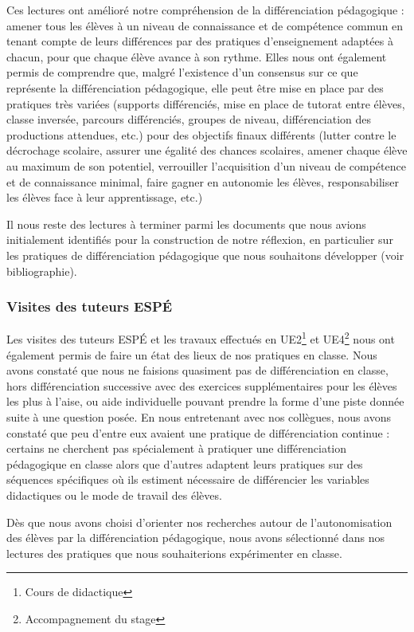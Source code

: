 Ces lectures ont amélioré notre compréhension de la différenciation pédagogique : amener tous les élèves à un niveau de connaissance et de compétence commun en tenant compte de leurs différences par des pratiques d’enseignement adaptées à chacun, pour que chaque élève avance à son rythme. Elles nous ont également permis de comprendre que, malgré l'existence d'un consensus sur ce que représente la différenciation pédagogique, elle peut être mise en place par des pratiques très variées (supports différenciés, mise en place de tutorat entre élèves, classe inversée, parcours différenciés, groupes de niveau, différenciation des productions attendues, etc.) pour des objectifs finaux différents (lutter contre le décrochage scolaire, assurer une égalité des chances scolaires, amener chaque élève au maximum de son potentiel, verrouiller l’acquisition d’un niveau de compétence et de connaissance minimal, faire gagner en autonomie les élèves, responsabiliser les élèves face à leur apprentissage, etc.)

Il nous reste des lectures à terminer parmi les documents que nous avions initialement identifiés pour la construction de notre réflexion, en particulier sur les pratiques de différenciation pédagogique que nous souhaitons développer (voir bibliographie).

\subsubsection{Visites des tuteurs ESPÉ}

Les visites des tuteurs ESPÉ et les travaux effectués en UE2\footnote{Cours de didactique} et UE4\footnote{Accompagnement du stage} nous ont également permis de faire un état des lieux de nos pratiques en classe. Nous avons constaté que nous ne faisions quasiment pas de différenciation en classe, hors différenciation successive avec des exercices supplémentaires pour les élèves les plus à l’aise, ou aide individuelle pouvant prendre la forme d’une piste donnée suite à une question posée.
En nous entretenant avec nos collègues, nous avons constaté que peu d’entre eux avaient une pratique de différenciation continue : certains ne cherchent pas spécialement à pratiquer une différenciation pédagogique en classe alors que d’autres adaptent leurs pratiques sur des séquences spécifiques où ils estiment nécessaire de différencier les variables didactiques ou le mode de travail des élèves.

Dès que nous avons choisi d’orienter nos recherches autour de l’autonomisation des élèves par la différenciation pédagogique, nous avons sélectionné dans nos lectures des pratiques que nous souhaiterions expérimenter en classe.

